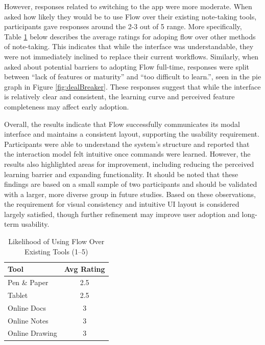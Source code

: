 \documentclass[12pt, titlepage]{article}
\begin{document}
\vspace{1em}

However, responses related to switching to the app were more moderate. When 
asked how likely they would be to use Flow over their existing note-taking 
tools, participants gave responses around the 2-3 out of 5 range. More 
specifically, Table \ref{tab:likelihood} below describes the average ratings
for adoping flow over other methods of note-taking. This indicates that 
while the interface was understandable, they were not immediately inclined
to replace their current workflows. Similarly, when asked about potential 
barriers to adopting Flow full-time, responses were split between 
“lack of features or maturity” and “too difficult to learn.”, seen in the 
pie graph in Figure \ref{fig:dealBreaker}. These responses suggest that 
while the interface is relatively clear and consistent, the learning curve 
and perceived feature completeness may affect early adoption.

\vspace{1em}

Overall, the results indicate that Flow successfully communicates its modal 
interface and maintains a consistent layout, supporting the usability 
requirement. Participants were able to understand the system's structure 
and reported that the interaction model felt intuitive once commands were 
learned. However, the results also highlighted areas for improvement, 
including reducing the perceived learning barrier and expanding 
functionality. It should be noted that these findings are based on a small 
sample of two participants and should be validated with a larger, more 
diverse group in future studies. Based on these observations, the requirement for visual 
consistency and intuitive UI layout is considered largely satisfied, though 
further refinement may improve user adoption and long-term usability.

\vspace{1em}

\begin{table}[H]
\centering
\label{tab:likelihood}
\begin{tabular}{|l|c|}
  \hline
  \textbf{Tool} & \textbf{Avg Rating} \\ \hline
  Pen \& Paper & 2.5 \\ \hline
  Tablet & 2.5 \\ \hline
  Online Docs & 3 \\ \hline
  Online Notes & 3 \\ \hline
  Online Drawing & 3 \\ \hline
\end{tabular}
\caption{Likelihood of Using Flow Over Existing Tools (1--5)}
\end{table}
\end{document}
